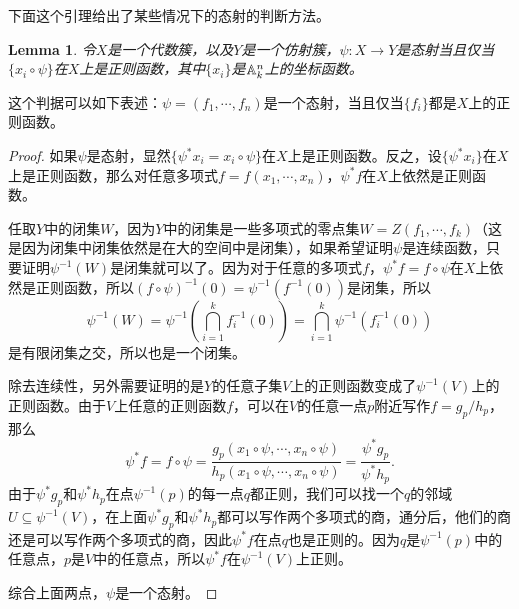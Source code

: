 \documentclass[9pt]{extbook}
\theoremstyle{plain}%
\newtheorem{lem}[defi]{Lemma}%
\begin{document}
下面这个引理给出了某些情况下的态射的判断方法。
\begin{lem}
	令$X$是一个代数簇，以及$Y$是一个仿射簇，$\psi:X\to Y$是态射当且仅当$\{x_i\circ \psi\}$在$X$上是正则函数，其中$\{x_i\}$是$\mathbb{A}^n_k$上的坐标函数。
	\label{c3:l1}
\end{lem}
这个判据可以如下表述：$\psi=(f_1,\cdots,f_n)$是一个态射，当且仅当$\{f_i\}$都是$X$上的正则函数。
\begin{proof}
	如果$\psi$是态射，显然$\{\psi^*x_i=x_i\circ \psi\}$在$X$上是正则函数。反之，设$\{\psi^*x_i\}$在$X$上是正则函数，那么对任意多项式$f=f(x_1,\cdots,x_n)$，$\psi^*f$在$X$上依然是正则函数。

	任取$Y$中的闭集$W$，因为$Y$中的闭集是一些多项式的零点集$W=Z(f_1,\cdots,f_k)$（这是因为闭集中闭集依然是在大的空间中是闭集），如果希望证明$\psi$是连续函数，只要证明$\psi^{-1}(W)$是闭集就可以了。因为对于任意的多项式$f$，$\psi^*f=f\circ \psi$在$X$上依然是正则函数，所以$(f\circ \psi)^{-1}(0)=\psi^{-1}(f^{-1}(0))$是闭集，所以
	\[
		\psi^{-1}(W)=\psi^{-1}\left(\bigcap_{i=1}^k f_i^{-1}(0)\right)=\bigcap_{i=1}^k\psi^{-1}\left( f_i^{-1}(0)\right)
	\]
	是有限闭集之交，所以也是一个闭集。

	除去连续性，另外需要证明的是$Y$的任意子集$V$上的正则函数变成了$\psi^{-1}(V)$上的正则函数。由于$V$上任意的正则函数$f$，可以在$V$的任意一点$p$附近写作$f=g_p/h_p$，那么
	\[
		\psi^*f=f\circ \psi=\frac{g_p(x_1\circ \psi,\cdots,x_n\circ \psi)}{h_p(x_1\circ \psi,\cdots,x_n\circ \psi)}=\frac{\psi^*g_p}{\psi^*h_p}.
	\]
	由于$\psi^*g_p$和$\psi^*h_p$在点$\psi^{-1}(p)$的每一点$q$都正则，我们可以找一个$q$的邻域$U\subseteq \psi^{-1}(V)$，在上面$\psi^*g_p$和$\psi^*h_p$都可以写作两个多项式的商，通分后，他们的商还是可以写作两个多项式的商，因此$\psi^*f$在点$q$也是正则的。因为$q$是$\psi^{-1}(p)$中的任意点，$p$是$V$中的任意点，所以$\psi^*f$在$\psi^{-1}(V)$上正则。

	综合上面两点，$\psi$是一个态射。
\end{proof}
\end{document}
